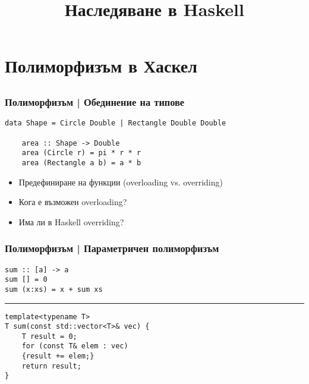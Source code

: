 \documentclass{beamer}
\begin{document}
\title[Наследяване]{Наследяване в Haskell}
\frame{\titlepage}

\section{Полиморфизъм в Хаскел}

\subsection{}
\begin{frame}[fragile]
\frametitle{Полиморфизъм | Обединение на типове}

  \begin{lstlisting}[basicstyle=\small]
    data Shape = Circle Double | Rectangle Double Double

    area :: Shape -> Double
    area (Circle r) = pi * r * r
    area (Rectangle a b) = a * b
  \end{lstlisting}

\begin{itemize}
  \item Предефиниране на функции (overloading vs. overriding)
  \item Кога е възможен overloading?
  \item Има ли в Haskell overriding?
\end{itemize}

\end{frame}

\begin{frame}[fragile]
\frametitle{Полиморфизъм | Параметричен полиморфизъм}

\begin{lstlisting}[basicstyle=\small]
sum :: [a] -> a
sum [] = 0
sum (x:xs) = x + sum xs
\end{lstlisting}

\begin{center}
\noindent\rule{6cm}{0.4pt}
\end{center}

\begin{lstlisting}[basicstyle=\small]
template<typename T>
T sum(const std::vector<T>& vec) {
    T result = 0;
    for (const T& elem : vec) 
    {result += elem;}
    return result;
}
\end{lstlisting}

\end{frame}
\end{document}
